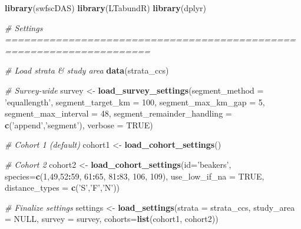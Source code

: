 \documentclass[
]{book}
\newenvironment{Shaded}{\begin{snugshade}}{\end{snugshade}}
\newcommand{\CommentTok}[1]{\textcolor[rgb]{0.56,0.35,0.01}{\textit{#1}}}
\newcommand{\DataTypeTok}[1]{\textcolor[rgb]{0.13,0.29,0.53}{#1}}
\newcommand{\DecValTok}[1]{\textcolor[rgb]{0.00,0.00,0.81}{#1}}
\newcommand{\KeywordTok}[1]{\textcolor[rgb]{0.13,0.29,0.53}{\textbf{#1}}}
\newcommand{\NormalTok}[1]{#1}
\newcommand{\OperatorTok}[1]{\textcolor[rgb]{0.81,0.36,0.00}{\textbf{#1}}}
\newcommand{\OtherTok}[1]{\textcolor[rgb]{0.56,0.35,0.01}{#1}}
\newcommand{\StringTok}[1]{\textcolor[rgb]{0.31,0.60,0.02}{#1}}
\begin{document}
\begin{Shaded}
\begin{Highlighting}[]
\KeywordTok{library}\NormalTok{(swfscDAS)}
\KeywordTok{library}\NormalTok{(LTabundR)}
\KeywordTok{library}\NormalTok{(dplyr)}

\CommentTok{# Settings =====================================================================}

\CommentTok{# Load strata & study area}
\KeywordTok{data}\NormalTok{(strata_ccs)}

\CommentTok{# Survey-wide}
\NormalTok{survey <-}\StringTok{ }
\StringTok{  }\KeywordTok{load_survey_settings}\NormalTok{(}\DataTypeTok{segment_method =} \StringTok{'equallength'}\NormalTok{,}
                       \DataTypeTok{segment_target_km =} \DecValTok{100}\NormalTok{,}
                       \DataTypeTok{segment_max_km_gap =} \DecValTok{5}\NormalTok{,}
                       \DataTypeTok{segment_max_interval =} \DecValTok{48}\NormalTok{,}
                       \DataTypeTok{segment_remainder_handling =} \KeywordTok{c}\NormalTok{(}\StringTok{'append'}\NormalTok{,}\StringTok{'segment'}\NormalTok{),}
                       \DataTypeTok{verbose =} \OtherTok{TRUE}\NormalTok{)}

\CommentTok{# Cohort 1 (default)}
\NormalTok{cohort1 <-}\StringTok{ }\KeywordTok{load_cohort_settings}\NormalTok{()}

\CommentTok{# Cohort 2}
\NormalTok{cohort2 <-}\StringTok{ }
\StringTok{  }\KeywordTok{load_cohort_settings}\NormalTok{(}\DataTypeTok{id=}\StringTok{'beakers'}\NormalTok{,}
                       \DataTypeTok{species=}\KeywordTok{c}\NormalTok{(}\DecValTok{1}\NormalTok{,}\DecValTok{49}\NormalTok{,}\DecValTok{52}\OperatorTok{:}\DecValTok{59}\NormalTok{, }\DecValTok{61}\OperatorTok{:}\DecValTok{65}\NormalTok{, }\DecValTok{81}\OperatorTok{:}\DecValTok{83}\NormalTok{, }\DecValTok{106}\NormalTok{, }\DecValTok{109}\NormalTok{),}
                       \DataTypeTok{use_low_if_na =} \OtherTok{TRUE}\NormalTok{,}
                       \DataTypeTok{distance_types =} \KeywordTok{c}\NormalTok{(}\StringTok{'S'}\NormalTok{,}\StringTok{'F'}\NormalTok{,}\StringTok{'N'}\NormalTok{))}

\CommentTok{# Finalize settings}
\NormalTok{settings <-}\StringTok{ }\KeywordTok{load_settings}\NormalTok{(}\DataTypeTok{strata =}\NormalTok{ strata_ccs,}
                          \DataTypeTok{study_area =} \OtherTok{NULL}\NormalTok{,}
                          \DataTypeTok{survey =}\NormalTok{ survey,}
                          \DataTypeTok{cohorts=}\KeywordTok{list}\NormalTok{(cohort1,}
\NormalTok{                                       cohort2))}



\end{Highlighting}
\end{Shaded}
\end{document}
